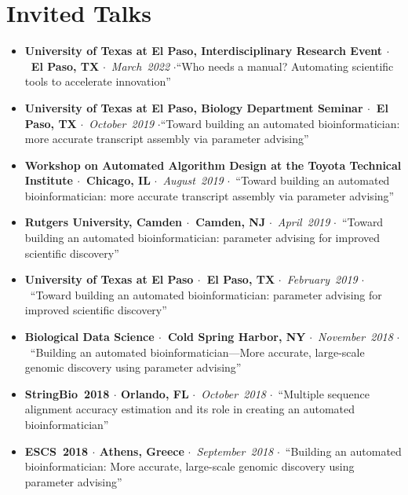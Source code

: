 \documentclass[10pt,letterpaper]{article}
\newcommand{\bigdot}{$\cdot$\xspace}
\begin{document}




\section*{Invited Talks}

\begin{itemize}[leftmargin=*,labelindent=5pt,itemindent=-15pt]
  \item \textbf{University of Texas at El Paso, Interdisciplinary Research Event \bigdot~El Paso, TX} \bigdot~\textit{March~2022} \bigdot ``Who needs a manual? Automating scientific tools to accelerate innovation''
  \item \textbf{University of Texas at El Paso, Biology Department Seminar \bigdot~El Paso, TX} \bigdot~\textit{October~2019} \bigdot ``Toward building an automated bioinformatician: more accurate transcript assembly via parameter advising''
  \item \textbf{Workshop on Automated Algorithm Design at the Toyota Technical Institute \bigdot~Chicago, IL} \bigdot~\textit{August~2019} \bigdot~``Toward building an automated bioinformatician: more accurate transcript assembly via parameter advising''
  \item \textbf{Rutgers University, Camden \bigdot~Camden, NJ} \bigdot~\textit{April~2019} \bigdot~``Toward building an automated bioinformatician: 
parameter advising for improved scientific discovery''
  \item \textbf{University of Texas at El Paso \bigdot~El Paso, TX} \bigdot~\textit{February~2019} \bigdot~``Toward building an automated bioinformatician: 
parameter advising for improved scientific discovery''
  \item \textbf{Biological Data Science \bigdot~Cold Spring Harbor, NY} \bigdot~\textit{November~2018} \bigdot~``Building an automated bioinformatician---More accurate, large-scale genomic discovery using parameter advising'' 
   \item \textbf{StringBio~2018 \bigdot Orlando, FL} \bigdot~\textit{October~2018} \bigdot~``Multiple sequence alignment accuracy estimation and its role in creating an automated bioinformatician'' 
   \item \textbf{ESCS~2018 \bigdot Athens, Greece} \bigdot~\textit{September~2018} \bigdot~``Building an automated bioinformatician: More accurate, large-scale genomic discovery using parameter advising''

\end{itemize}
\end{document}
